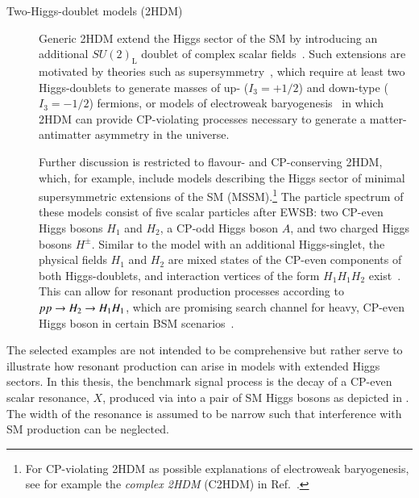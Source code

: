 \begin{description}
\item[Two-Higgs-doublet models (2HDM)] Generic 2HDM extend the Higgs sector of
  the SM by introducing an additional $SU(2)_{\text{L}}$ doublet of complex
  scalar fields~\cite{Gunion:1989we,Branco:2011iw}. Such extensions are
  motivated by theories such as supersymmetry~\cite{Haber:1984rc}, which require
  at least two Higgs-doublets to generate masses of up- ($I_3 = + 1/2$) and
  down-type ($I_3 = - 1/2$) fermions, or models of electroweak
  baryogenesis~\cite{Trodden:1998ym} in which 2HDM can provide CP-violating
  processes necessary to generate a matter-antimatter asymmetry in the universe.

  Further discussion is restricted to flavour- and CP-conserving 2HDM, which,
  for example, include models describing the Higgs sector of minimal
  supersymmetric extensions of the SM (MSSM).\footnote{For CP-violating 2HDM as
    possible explanations of electroweak baryogenesis, see for example the
    \emph{complex 2HDM} (C2HDM) in Ref.~\cite{Fontes:2017zfn}.}
  The particle spectrum of these models consist of five scalar particles after
  EWSB: two CP-even Higgs bosons $H_1$ and $H_2$, a CP-odd Higgs boson $A$, and
  two charged Higgs bosons $H^\pm$. Similar to the model with an additional
  Higgs-singlet, the physical fields $H_1$ and $H_2$ are mixed states of the
  CP-even components of both Higgs-doublets, and interaction vertices of the
  form $H_1 H_1 H_2$ exist~\cite{Gunion:1989we,Branco:2011iw}. This can allow
  for resonant production processes according to $pp \to H_2 \to H_1 H_1$,
  which are promising search channel for heavy, CP-even Higgs boson in certain
  BSM scenarios~\cite{Dolan:2012ac,Djouadi:2013vqa,Djouadi:2013uqa}.

\end{description}
The selected examples are not intended to be comprehensive but rather serve to
illustrate how resonant \HH production can arise in models with extended Higgs
sectors. In this thesis, the benchmark signal process is the decay of a CP-even
scalar resonance, $X$, produced via \ggF into a pair of SM Higgs bosons as
depicted in . The width of the resonance is
assumed to be narrow such that interference with SM \HH production can be
neglected.

